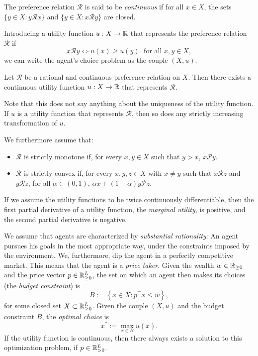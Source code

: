 \documentclass[twoside, titlepage]{article}
\begin{document}
\begin{assumption}[Continuity] \label{ass:continuity}
    The preference relation $\mathcal{R}$ is said to be \textit{continuous} if for all $x \in X$, the sets $\{y \in X : y \mathcal{R} x\}$ and $\{y \in X : x \mathcal{R} y\}$ are closed.
\end{assumption}

Introducing a utility function $u : X \to \mathbb{R}$ that represents the preference relation $\mathcal{R}$ if 
\[
    x \mathcal{R} y \iff u(x) \geq u(y) \; \text{ for all } x, y \in X,
\]
we can write the agent's choice problem as the couple $(X, u)$. 

\begin{theorem}
    Let $\mathcal{R}$ be a rational and continuous preference relation on $X$. Then there exists a continuous utility function $u : X \to \mathbb{R}$ that represents $\mathcal{R}$.
\end{theorem}
Note that this does not say anything about the uniqueness of the utility function. If $u$ is a utility function that represents $\mathcal{R}$, then so does any strictly increasing transformation of $u$.

\begin{assumption}
    We furthermore assume that:
    \begin{itemize}
        \item $\mathcal{R}$ is strictly monotone if, for every $x, y \in X$ such that $y > x$, $x \mathcal{P} y$.
        \item $\mathcal{R}$ is strictly convex if, for every $x, y, z \in X$ with $x \not = y$ such that $x \mathcal{R} z$ and $y \mathcal{R} z$, for all $\alpha \in (0, 1)$, $\alpha x + (1 - \alpha) y \mathcal{P} z$.
    \end{itemize}
\end{assumption}
If we assume the utility functions to be twice continuously differentiable, then the first partial derivative of a utility function, the \textit{marginal utility}, is positive, and the second partial derivative is negative.

We assume that agents are characterized by \textit{substantial rationality}: An agent pursues his goals in the most appropriate way, under the constraints imposed by the environment. We, furthermore, dip the agent in a perfectly competitive market. This means that the agent is a \textit{price taker}. Given the wealth $w \in \mathbb{R}_{\geq0}$ and the price vector $p \in \mathbb{R}_{\geq 0}^L$, the set on which an agent then makes its choices (the \textit{budget constraint}) is
\[
B := \left\{x \in X : p^\top x \leq w\right\},
\]
for some closed set $X \subset \mathbb{R}_{\geq0}^L$. Given the couple $(X, u)$ and the budget constraint $B$, the \textit{optimal choice} is
\[
    x^* := \max_{x \in B} u(x).
\]
If the utility function is continuous, then there always exists a solution to this optimization problem, if $p \in \mathbb{R}_{>0}^L$.
\end{document}
